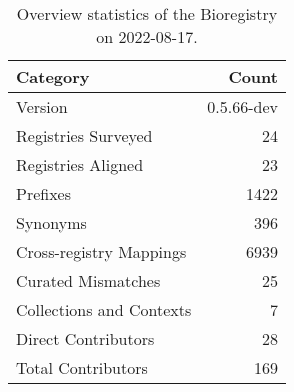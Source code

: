 \begin{table}
\centering
\caption{Overview statistics of the Bioregistry on 2022-08-17.}
\label{tab:bioregistry-summary}
\begin{tabular}{lr}
\toprule
                Category &      Count \\
\midrule
                 Version & 0.5.66-dev \\
     Registries Surveyed &         24 \\
      Registries Aligned &         23 \\
                Prefixes &       1422 \\
                Synonyms &        396 \\
 Cross-registry Mappings &       6939 \\
      Curated Mismatches &         25 \\
Collections and Contexts &          7 \\
     Direct Contributors &         28 \\
      Total Contributors &        169 \\
\bottomrule
\end{tabular}
\end{table}
